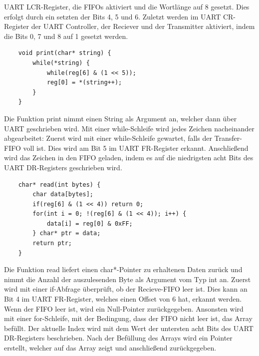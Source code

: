 \documentclass[12pt]{article}
\begin{document}
UART LCR-Register, die FIFOs aktiviert und die Wortlänge auf 8 gesetzt. Dies erfolgt durch ein setzten der Bits 4, 5 und 6. Zuletzt werden im UART CR-Register der UART Controller, der Reciever und der Transmitter aktiviert, indem die Bits 0, 7 und 8 auf 1 gesetzt werden.\\
\begin{verbatim}
    void print(char* string) {
        while(*string) {
            while(reg[6] & (1 << 5));
            reg[0] = *(string++);
        }
    }
\end{verbatim}
Die Funktion print nimmt einen String als Argument an, welcher dann über UART geschrieben wird. Mit einer while-Schleife wird jedes Zeichen nacheinander abgearbeitet: Zuerst wird mit einer while-Schleife gewartet, falls der Transfer-FIFO voll ist. Dies wird am Bit 5 im UART FR-Register erkannt. Anschließend wird das Zeichen in den FIFO geladen, indem es auf die niedrigsten acht Bits des UART DR-Registers geschrieben wird.\\
\begin{verbatim}
    char* read(int bytes) {
        char data[bytes];
        if(reg[6] & (1 << 4)) return 0;
        for(int i = 0; !(reg[6] & (1 << 4)); i++) {
            data[i] = reg[0] & 0xFF;
        } char* ptr = data;
        return ptr;
    }
\end{verbatim}
Die Funktion read liefert einen char*-Pointer zu erhaltenen Daten zurück und nimmt die Anzahl der auszulesenden Byte als Argument vom Typ int an. Zuerst wird mit einer if-Abfrage überprüft, ob der Recieve-FIFO leer ist. Dies kann an Bit 4 im UART FR-Register, welches einen Offset von 6 hat, erkannt werden. Wenn der FIFO leer ist, wird ein Null-Pointer zurückgegeben. Ansonsten wird mit einer for-Schleife, mit der Bedingung, dass der FIFO nicht leer ist, das Array befüllt. Der aktuelle Index wird mit dem Wert der untersten acht Bits des UART DR-Registers beschrieben. Nach der Befüllung des Arrays wird ein Pointer erstellt, welcher auf das Array zeigt und anschließend zurückgegeben.
\end{document}
